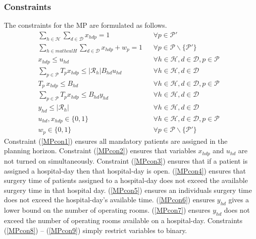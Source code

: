 \subsubsection*{Constraints} The constraints for the MP are formulated as follows.
\begin{align}
    \sum\limits_{h \in \mathcal{H}} \sum\limits_{d \in \mathcal{D}}x_{hdp} = 1 
        && \forall p \in \mathcal{P}' \label{MPcon1}\\
    \sum\limits_{h \in mathcal{H}} \sum\limits_{d \in \mathcal{D}} x_{hdp} + w_p = 1
        && \forall p \in \mathcal{P} \backslash \{\mathcal{P}'\}\label{MPcon2}\\
    x_{hdp} \leq u_{hd}
        && \forall h \in \mathcal{H}, d \in \mathcal{D}, p \in \mathcal{P}\label{MPcon3}\\
    \sum\limits_{p \in \mathcal{P}}T_px_{hdp} \leq |\mathcal{R}_h|B_{hd}u_{hd}
        && \forall h \in \mathcal{H}, d \in \mathcal{D} \label{MPcon4}\\
    T_p\,x_{hdp} \leq B_{hd} 
        && \forall h \in \mathcal{H}, d \in \mathcal{D}, p \in \mathcal{P}\label{MPcon5}\\
     \sum_{p \in \mathcal{P}}T_px_{hdp} \leq B_{hd}y_{hd}
        && \forall h \in \mathcal{H}, d\in \mathcal{D} \label{MPcon6}\\
        y_{hd} \leq |\mathcal{R}_h|
        && \forall h\in\mathcal{H}, d \in \mathcal{D} \label{MPcon7}\\
        u_{hd}, x_{hdp} \in \{ 0,1\}
        && \forall h\in \mathcal{H}, d \in \mathcal{D}, p \in \mathcal{P}\label{MPcon8}\\
        w_p \in \{0,1\}
        && \forall p \in \mathcal{P} \backslash\{\mathcal{P}'\}\label{MPcon9}
\end{align}
Constraint (\ref{MPcon1}) ensures all mandatory patients are assigned in the planning 
horizon. Constraint (\ref{MPcon2}) ensures that variables $x_{hdp}$ and $u_{hd}$ are not
turned on simultaneously. Constraint (\ref{MPcon3}) ensures that if a patient is assigned
a hospital-day then that hospital-day is open. (\ref*{MPcon4}) ensures that surgery time 
of patients assigned to a hospital-day does not exceed the available surgery time in
that hospital day. (\ref*{MPcon5}) ensures an individuals surgery time does not exceed 
the hospital-day's available time. (\ref*{MPcon6}) ensures $y_{hd}$ gives a lower bound 
on the number of operating rooms. (\ref*{MPcon7}) ensures $y_{hd}$ does not exceed the
number of operating rooms available on a hospital-day. Constraints (\ref*{MPcon8}) -- (\ref*{MPcon9}) simply restrict
variables to binary.

